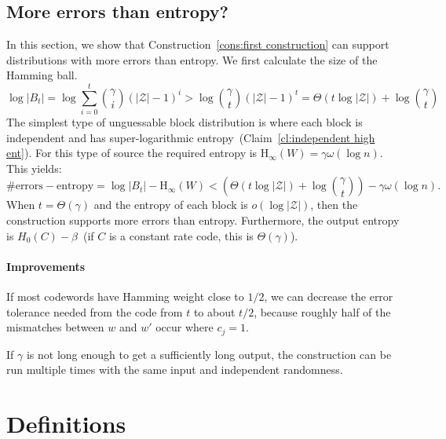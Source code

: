 \documentclass[11pt]{article}
\newcommand{\clref}[1]{\mbox{Claim~\ref{#1}}}
\newcommand{\consref}[1]{\mbox{Construction~\ref{#1}}}
\newcommand{\Hoo}{\mathrm{H}_\infty}
\begin{document}
\subsection{More errors than entropy?}
\label{sec:discussion}
In this section, we show that \consref{cons:first construction} can support distributions with more errors than entropy.
We first calculate the size of the Hamming ball.  
\[
\log |B_t| = \log \sum_{i=0}^t {\gamma \choose i} (|\mathcal{Z}|-1)^i> \log {\gamma \choose t} (|\mathcal{Z}|-1)^t =\Theta(t\log |\mathcal{Z}|) + \log {\gamma\choose t}
\]
The simplest type of unguessable block distribution is where each block is independent and has super-logarithmic entropy~(\clref{cl:independent high ent}).  For this type of source the required entropy is $\Hoo(W) = \gamma\omega(\log n)$.  This yields:
\[
\text{\# errors} - \text{entropy} = \log |B_t| -  \Hoo(W)  <\left( \Theta(t\log |\mathcal{Z}|) + \log {\gamma \choose t}\right) -  \gamma \omega(\log n) .
\]
When $t =\Theta(\gamma)$ and the entropy of each block is $o(\log |\mathcal{Z}|)$, then the construction supports more errors than entropy. Furthermore, the output entropy is $H_0(C) -\beta$~(if $C$ is a constant rate code, this is $\Theta(\gamma)$).

\paragraph{Improvements}  If most codewords have Hamming weight close to $1/2$, we can decrease the error tolerance needed from the code from $t$ to  about $t/2$, because roughly half of the mismatches between $w$ and $w'$ occur where $c_j =1$. 

If $\gamma$ is not long enough to get a sufficiently long output, the construction can be run multiple times with the same input and independent randomness. 





\appendix

\section{Definitions}
\end{document}
